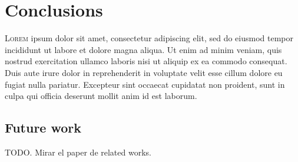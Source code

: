 

\chapter{Conclusions} \label{cha:concl}



\lettrine{L}{orem} ipsum dolor sit amet, consectetur
adipiscing elit, sed do eiusmod tempor incididunt ut labore et dolore magna
aliqua. Ut enim ad minim veniam, quis nostrud exercitation ullamco laboris nisi
ut aliquip ex ea commodo consequat. Duis aute irure dolor in reprehenderit in
voluptate velit esse cillum dolore eu fugiat nulla pariatur. Excepteur sint
occaecat cupidatat non proident, sunt in culpa qui officia deserunt mollit anim
id est laborum.



\section{Future work}

TODO. Mirar el paper de related works.
